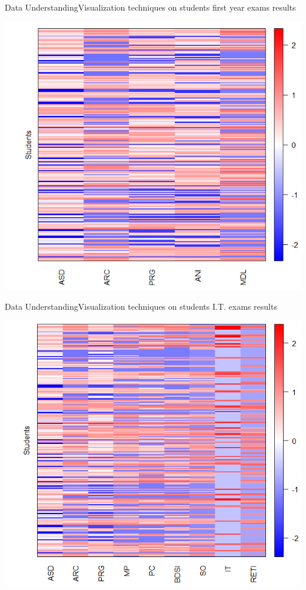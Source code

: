 \begin{frame}{Data Understanding}{Visualization techniques on students first year exams results}

    \begin{centering}
        \includegraphics[scale=0.47]{../thesis/img/std_dev_matrix_1.png}
    \end{centering}

\end{frame}

\begin{frame}{Data Understanding}{Visualization techniques on students I.T. exams results}

    \begin{centering}
        \includegraphics[scale=0.48]{../thesis/img/std_dev_matrix_2.png}
    \end{centering}

\end{frame}

